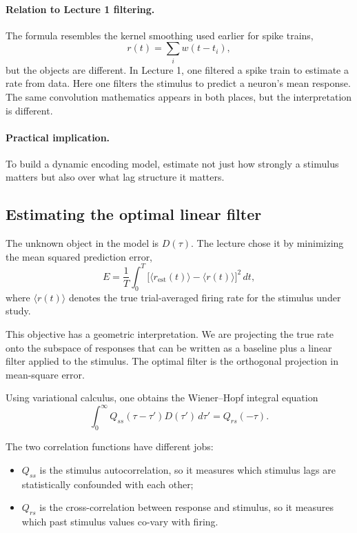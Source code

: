 \paragraph{Relation to Lecture 1 filtering.}
The formula resembles the kernel smoothing used earlier for spike trains,
\[
r(t)=\sum_i w(t-t_i),
\]
but the objects are different. In Lecture 1, one filtered a spike train to estimate a rate from data. Here one filters the stimulus to predict a neuron's mean response. The same convolution mathematics appears in both places, but the interpretation is different.

\paragraph{Practical implication.}
To build a dynamic encoding model, estimate not just how strongly a stimulus matters but also over what lag structure it matters.

\subsection{Estimating the optimal linear filter}

The unknown object in the model is $D(\tau)$. The lecture chose it by minimizing the mean squared prediction error,
\[
E = \frac{1}{T}\int_0^T \bigl[\langle r_{\mathrm{est}}(t)\rangle - \langle r(t)\rangle\bigr]^2\,dt,
\]
where $\langle r(t)\rangle$ denotes the true trial-averaged firing rate for the stimulus under study.

This objective has a geometric interpretation. We are projecting the true rate onto the subspace of responses that can be written as a baseline plus a linear filter applied to the stimulus. The optimal filter is the orthogonal projection in mean-square error.

Using variational calculus, one obtains the Wiener--Hopf integral equation
\[
\int_0^{\infty} Q_{ss}(\tau-\tau')D(\tau')\,d\tau' = Q_{rs}(-\tau).
\]

The two correlation functions have different jobs:
\begin{itemize}
    \item $Q_{ss}$ is the stimulus autocorrelation, so it measures which stimulus lags are statistically confounded with each other;
    \item $Q_{rs}$ is the cross-correlation between response and stimulus, so it measures which past stimulus values co-vary with firing.
\end{itemize}

